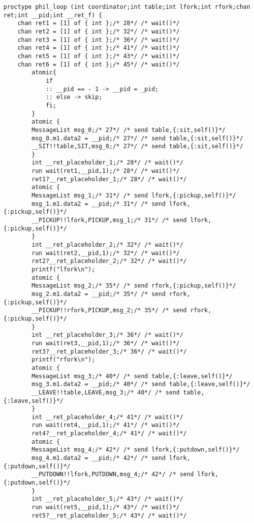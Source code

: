 \begin{lstlisting}[xleftmargin=.001\linewidth, xrightmargin=0.001\linewidth, caption={Dining Philosophers Promela translation.}, label={lst:promela_dp}]
    proctype phil_loop (int coordinator;int table;int lfork;int rfork;chan ret;int __pid;int __ret_f) {
    chan ret1 = [1] of { int };/* 28*/ /* wait()*/ 
    chan ret2 = [1] of { int };/* 32*/ /* wait()*/ 
    chan ret3 = [1] of { int };/* 36*/ /* wait()*/ 
    chan ret4 = [1] of { int };/* 41*/ /* wait()*/ 
    chan ret5 = [1] of { int };/* 43*/ /* wait()*/ 
    chan ret6 = [1] of { int };/* 45*/ /* wait()*/ 
        atomic{
            if
            :: __pid == - 1 -> __pid = _pid;
            :: else -> skip;
            fi;
        }
        atomic {
        MessageList msg_0;/* 27*/ /* send table,{:sit,self()}*/ 
        msg_0.m1.data2 = __pid;/* 27*/ /* send table,{:sit,self()}*/ 
        __SIT!!table,SIT,msg_0;/* 27*/ /* send table,{:sit,self()}*/ 
        }
        int __ret_placeholder_1;/* 28*/ /* wait()*/ 
        run wait(ret1,__pid,1);/* 28*/ /* wait()*/ 
        ret1?__ret_placeholder_1;/* 28*/ /* wait()*/ 
        atomic {
        MessageList msg_1;/* 31*/ /* send lfork,{:pickup,self()}*/ 
        msg_1.m1.data2 = __pid;/* 31*/ /* send lfork,{:pickup,self()}*/ 
        __PICKUP!!lfork,PICKUP,msg_1;/* 31*/ /* send lfork,{:pickup,self()}*/ 
        }
        int __ret_placeholder_2;/* 32*/ /* wait()*/ 
        run wait(ret2,__pid,1);/* 32*/ /* wait()*/ 
        ret2?__ret_placeholder_2;/* 32*/ /* wait()*/ 
        printf("lfork\n");
        atomic {
        MessageList msg_2;/* 35*/ /* send rfork,{:pickup,self()}*/ 
        msg_2.m1.data2 = __pid;/* 35*/ /* send rfork,{:pickup,self()}*/ 
        __PICKUP!!rfork,PICKUP,msg_2;/* 35*/ /* send rfork,{:pickup,self()}*/ 
        }
        int __ret_placeholder_3;/* 36*/ /* wait()*/ 
        run wait(ret3,__pid,1);/* 36*/ /* wait()*/ 
        ret3?__ret_placeholder_3;/* 36*/ /* wait()*/ 
        printf("rfork\n");
        atomic {
        MessageList msg_3;/* 40*/ /* send table,{:leave,self()}*/ 
        msg_3.m1.data2 = __pid;/* 40*/ /* send table,{:leave,self()}*/ 
        __LEAVE!!table,LEAVE,msg_3;/* 40*/ /* send table,{:leave,self()}*/ 
        }
        int __ret_placeholder_4;/* 41*/ /* wait()*/ 
        run wait(ret4,__pid,1);/* 41*/ /* wait()*/ 
        ret4?__ret_placeholder_4;/* 41*/ /* wait()*/ 
        atomic {
        MessageList msg_4;/* 42*/ /* send lfork,{:putdown,self()}*/ 
        msg_4.m1.data2 = __pid;/* 42*/ /* send lfork,{:putdown,self()}*/ 
        __PUTDOWN!!lfork,PUTDOWN,msg_4;/* 42*/ /* send lfork,{:putdown,self()}*/ 
        }
        int __ret_placeholder_5;/* 43*/ /* wait()*/ 
        run wait(ret5,__pid,1);/* 43*/ /* wait()*/ 
        ret5?__ret_placeholder_5;/* 43*/ /* wait()*/ 

\end{lstlisting}

